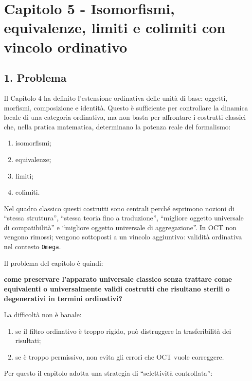\chapter{Capitolo 5 - Isomorfismi, equivalenze, limiti e colimiti con vincolo ordinativo}

\section{1. Problema}

Il Capitolo 4 ha definito l'estensione ordinativa delle unità di base: oggetti, morfismi, composizione e identità. Questo è sufficiente per controllare la dinamica locale di una categoria ordinativa, ma non basta per affrontare i costrutti classici che, nella pratica matematica, determinano la potenza reale del formalismo:

\begin{enumerate}
\def\labelenumi{\arabic{enumi}.}
\tightlist
\item
  isomorfismi;
\item
  equivalenze;
\item
  limiti;
\item
  colimiti.
\end{enumerate}

Nel quadro classico questi costrutti sono centrali perché esprimono nozioni di ``stessa struttura'', ``stessa teoria fino a traduzione'', ``migliore oggetto universale di compatibilità'' e ``migliore oggetto universale di aggregazione''. In OCT non vengono rimossi; vengono sottoposti a un vincolo aggiuntivo: validità ordinativa nel contesto \texttt{Omega}.

Il problema del capitolo è quindi:

\textbf{come preservare l'apparato universale classico senza trattare come equivalenti o universalmente validi costrutti che risultano sterili o degenerativi in termini ordinativi?}

La difficoltà non è banale:

\begin{enumerate}
\def\labelenumi{\arabic{enumi}.}
\tightlist
\item
  se il filtro ordinativo è troppo rigido, può distruggere la trasferibilità dei risultati;
\item
  se è troppo permissivo, non evita gli errori che OCT vuole correggere.
\end{enumerate}

Per questo il capitolo adotta una strategia di ``selettività controllata'':

